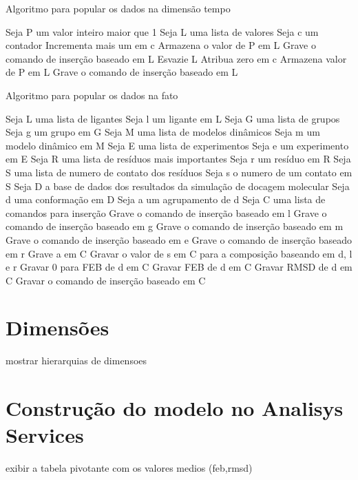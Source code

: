\begin{algorithm}[H]
\caption{Algoritmo para popular os dados na dimensão tempo}
\label{criaDadosDIMTempo}
\begin{algorithmic}[1]
	\STATE Seja P um valor inteiro maior que 1
	\STATE Seja L uma lista de valores
	\STATE Seja c um contador
		\STATE Incrementa mais um em c
			\STATE Armazena o valor de P em L
			\STATE Grave o comando de inserção baseado em L
			\STATE Esvazie L
			\STATE Atribua zero em c
		\ELSE
			\STATE Armazena valor de P em L
		\ENDIF
	\ENDFOR
		\STATE Grave o comando de inserção baseado em L
	\ENDIF
\end{algorithmic}
\end{algorithm}

\begin{algorithm}[H]
\caption{Algoritmo para popular os dados na fato}
\label{ciraDadosFato}
\begin{algorithmic}[1]
	\STATE Seja L uma lista de ligantes
	\STATE Seja l um ligante em L
	\STATE Seja G uma lista de grupos
	\STATE Seja g um grupo em G
	\STATE Seja M uma lista de modelos dinâmicos
	\STATE Seja m um modelo dinâmico em M
	\STATE Seja E uma lista de experimentos
	\STATE Seja e um experimento em E
	\STATE Seja R uma lista de resíduos mais importantes
	\STATE Seja r um resíduo em R
	\STATE Seja S uma lista de numero de contato dos resíduos
	\STATE Seja s o numero de um contato em S
	\STATE Seja D a base de dados dos resultados da simulação de docagem molecular
	\STATE Seja d uma conformação em D
	\STATE Seja a um agrupamento de d
	\STATE Seja C uma lista de comandos para inserção
		\STATE Grave o comando de inserção baseado em l
	\ENDFOR
		\STATE Grave o comando de inserção baseado em g
        \ENDFOR
		\STATE Grave o comando de inserção baseado em m
        \ENDFOR
		\STATE Grave o comando de inserção baseado em e
        \ENDFOR
		\STATE Grave o comando de inserção baseado em r
	\ENDFOR
		\STATE Grave a em C
				\STATE Gravar o valor de s em C para a composição baseando em d, l e r
			\ENDFOR
				\STATE Gravar 0 para FEB de d em C
			\ELSE
				\STATE Gravar FEB de d em C
			\ENDIF
			\STATE Gravar RMSD de d em C
			\STATE Gravar o comando de inserção baseado em C
		\ENDFOR
	\ENDFOR
\end{algorithmic}
\end{algorithm}


\section{Dimensões}
	mostrar hierarquias de dimensoes
	
\section{Construção do modelo no Analisys Services}
	exibir a tabela pivotante com os valores medios (feb,rmsd)
